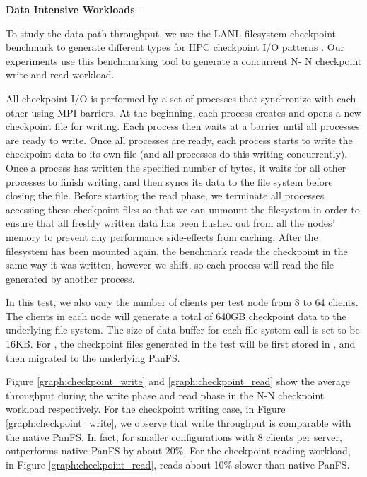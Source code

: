 
\textbf{Data Intensive Workloads -- }

To study the data path throughput, we use the LANL filesystem checkpoint 
benchmark to generate different types for HPC checkpoint I/O patterns
\cite{mpiio}.
Our experiments use this benchmarking tool to generate a concurrent N-
N checkpoint write and read workload.

All checkpoint I/O is performed by a set of processes
that synchronize with each other using MPI barriers.
At the beginning, each process creates and opens a new checkpoint file
for writing. 
Each process then waits at a barrier until all processes are ready to write.
Once all processes are ready, each process starts to write the checkpoint data 
to its own file (and all processes do this writing concurrently).
Once a process has written the specified number of bytes, it waits for all
other processes to finish writing, and then syncs its data to the file system
before closing the file.
Before starting the read phase, we terminate all processes
accessing these checkpoint files so that
we can unmount the filesystem in order to ensure that
all freshly written data has been flushed out from all the nodes' memory
to prevent any performance side-effects from caching.
After the filesystem has been mounted again,
the benchmark reads the checkpoint in the same way it was written,
however we shift, so each process will read
the file generated by another process.

In this test, we also vary the number of clients per test node
from 8 to 64 clients. The clients in each node will generate a total of
640GB checkpoint data to the underlying file system.
The size of data buffer for each file system call is set to be 16KB.
For \psys, the checkpoint files generated in the test will be
first stored in \tfs, and then migrated to the underlying PanFS.

Figure \ref{graph:checkpoint_write} and \ref{graph:checkpoint_read}
show the average throughput during the write phase and read phase
in the N-N checkpoint workload respectively. 
For the checkpoint writing case, in Figure \ref{graph:checkpoint_write}, we 
observe that \psys write throughput is comparable with the native PanFS. In
fact, for smaller configurations with 8 clients per server, \psys outperforms
native PanFS by about 20\%.
For the checkpoint reading workload, in Figure \ref{graph:checkpoint_read}, 
\psys reads about 10\% slower than native PanFS.

